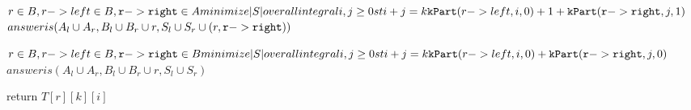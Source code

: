 \documentclass[11pt]{article}
\begin{document}
          $r \in B, r->left \in B, \mathtt{r->right } \in A\\
              minimize |S| over all integral i,j \geq 0 st i+j = k\\
                    \mathtt{kPart}(r->left,i,0) + 1 + \mathtt{kPart}(\mathtt{r->right },j,1)$\\
                $answer is (A_l \cup A_r,B_l \cup B_r \cup {r},S_l \cup S_r \cup {(r, \mathtt{r->right })})$

          $r \in B, r->left \in B, \mathtt{r->right } \in B\\
              minimize |S| over all integral i,j \geq 0 st i+j = k\\
                    \mathtt{kPart}(r->left,i,0) +     \mathtt{kPart}(\mathtt{r->right },j,0)$\\
                $answer is (A_l \cup A_r,B_l \cup B_r \cup {r},S_l \cup S_r)$


   return $T[r][k][i]$
\end{document}

